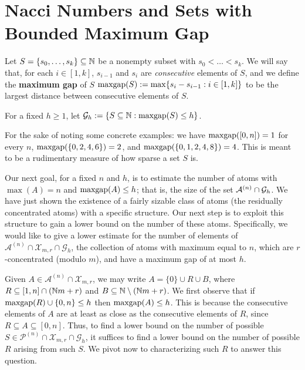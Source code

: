 \section{Nacci Numbers and Sets with Bounded Maximum Gap}

\begin{defn} \label{def:maxgap}
Let $S = \{s_0,\dots, s_k\} \subseteq \mathbb{N}$ be a nonempty subset with $s_0 < \dots < s_k$.
We will say that, for each $i\in [1,k]$, $s_{i-1}$ and $s_i$ are \textit{consecutive} elements of $S$, and we define the \textbf{maximum gap} of $S$ $\operatorname{maxgap}(S) := \max \{s_i - s_{i-1} : i\in [1,k]\}$ to be the largest distance between consecutive elements of $S$.

For a fixed $h\ge 1$, let $\mathcal{G}_h := \{S\subseteq \mathbb{N}: \operatorname{maxgap}(S) \le h\}$.
\end{defn}

For the sake of noting some concrete examples: we have $\operatorname{maxgap}([0,n]) = 1$ for every $n$, $\operatorname{maxgap}(\{0,2,4,6\}) = 2$, and $\operatorname{maxgap}(\{0,1,2,4,8\}) = 4$.
This is meant to be a rudimentary measure of how sparse a set $S$ is.

Our next goal, for a fixed $n$ and $h$, is to estimate the number of atoms with $\max(A) = n$ and $\operatorname{maxgap}(A) \le h$; that is, the size of the set $\mathcal{A}^{(n)}\cap \mathcal{G}_h$.
We have just shown the existence of a fairly sizable class of atoms (the residually concentrated atoms) with a specific structure.  
Our next step is to exploit this structure to gain a lower bound on the number of these atoms.
Specifically, we would like to give a lower estimate for the number of elements of $\mathcal{A}^{(n)}\cap \mathcal{X}_{m,r} \cap \mathcal{G}_h$, the collection of atoms with maximum equal to $n$, which are $r$-concentrated (modulo $m$), and have a maximum gap of at most $h$.

Given $A\in \mathcal{A}^{(n)}\cap \mathcal{X}_{m,r}$, we may write $A = \{0\}\cup R \cup B$, where $R \subseteq [1,n]\cap (\mathbb{N} m+r)$ and $B\subseteq \mathbb{N}\setminus (\mathbb{N} m + r)$.
We first observe that if $\operatorname{maxgap}(R)\cup\{0,n\}\le h$ then $\operatorname{maxgap}(A)\le h$. 
This is because the consecutive elements of $A$ are at least as close as the consecutive elements of $R$, since $R\subseteq A\subseteq [0,n]$.
Thus, to find a lower bound on the number of possible $S\in \mathcal{P}^{(n)}\cap \mathcal{X}_{m,r}\cap \mathcal{G}_h$, it suffices to find a lower bound on the number of possible $R$ arising from such $S$.
We pivot now to characterizing such $R$ to answer this question.


